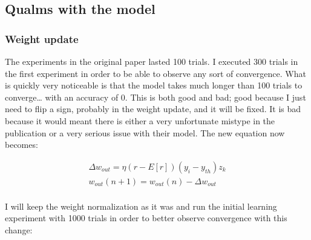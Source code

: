 \documentclass[11pt]{article}
\begin{document}
    \hypertarget{qualms-with-the-model}{%
\subsection{Qualms with the model}\label{qualms-with-the-model}}

\hypertarget{weight-update}{%
\subsubsection{Weight update}\label{weight-update}}

The experiments in the original paper lasted 100 trials. I executed 300
trials in the first experiment in order to be able to observe any sort
of convergence. What is quickly very noticeable is that the model takes
much longer than 100 trials to converge\ldots{} with an accuracy of 0.
This is both good and bad; good because I just need to flip a sign,
probably in the weight update, and it will be fixed. It is bad because
it would meant there is either a very unfortunate mistype in the
publication or a very serious issue with their model. The new equation
now becomes:

\begin{align}
\Delta w_{out} = \eta (r - E[r]) (y_i - y_{th}) z_k \\
w_{out}(n + 1) = w_{out}(n) - \Delta w_{out} \\
\end{align}

I will keep the weight normalization as it was and run the initial
learning experiment with 1000 trials in order to better observe
convergence with this change:
\end{document}
